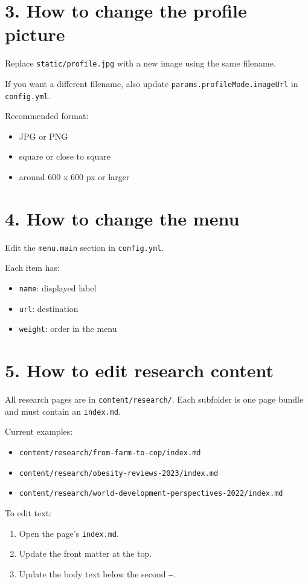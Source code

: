 \documentclass[11pt]{article}
\begin{document}
\section*{3. How to change the profile picture}
Replace \texttt{static/profile.jpg} with a new image using the same filename.

If you want a different filename, also update \texttt{params.profileMode.imageUrl} in \texttt{config.yml}.

Recommended format:
\begin{itemize}
\item JPG or PNG
\item square or close to square
\item around 600 x 600 px or larger
\end{itemize}

\section*{4. How to change the menu}
Edit the \texttt{menu.main} section in \texttt{config.yml}.

Each item has:
\begin{itemize}
\item \texttt{name}: displayed label
\item \texttt{url}: destination
\item \texttt{weight}: order in the menu
\end{itemize}

\section*{5. How to edit research content}
All research pages are in \texttt{content/research/}. Each subfolder is one page bundle and must contain an \texttt{index.md}.

Current examples:
\begin{itemize}
\item \texttt{content/research/from-farm-to-cop/index.md}
\item \texttt{content/research/obesity-reviews-2023/index.md}
\item \texttt{content/research/world-development-perspectives-2022/index.md}
\end{itemize}

To edit text:
\begin{enumerate}
\item Open the page's \texttt{index.md}.
\item Update the front matter at the top.
\item Update the body text below the second \texttt{---}.
\end{enumerate}
\end{document}
